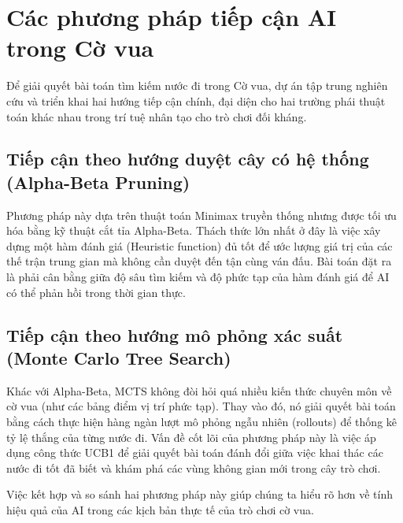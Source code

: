 \section{Các phương pháp tiếp cận AI trong Cờ vua}

Để giải quyết bài toán tìm kiếm nước đi trong Cờ vua, dự án tập trung nghiên cứu và triển khai hai hướng tiếp cận chính, đại diện cho hai trường phái thuật toán khác nhau trong trí tuệ nhân tạo cho trò chơi đối kháng.

\subsection{Tiếp cận theo hướng duyệt cây có hệ thống (Alpha-Beta Pruning)}
Phương pháp này dựa trên thuật toán Minimax truyền thống nhưng được tối ưu hóa bằng kỹ thuật cắt tỉa Alpha-Beta. Thách thức lớn nhất ở đây là việc xây dựng một hàm đánh giá (Heuristic function) đủ tốt để ước lượng giá trị của các thế trận trung gian mà không cần duyệt đến tận cùng ván đấu. Bài toán đặt ra là phải cân bằng giữa độ sâu tìm kiếm và độ phức tạp của hàm đánh giá để AI có thể phản hồi trong thời gian thực.

\subsection{Tiếp cận theo hướng mô phỏng xác suất (Monte Carlo Tree Search)}
Khác với Alpha-Beta, MCTS không đòi hỏi quá nhiều kiến thức chuyên môn về cờ vua (như các bảng điểm vị trí phức tạp). Thay vào đó, nó giải quyết bài toán bằng cách thực hiện hàng ngàn lượt mô phỏng ngẫu nhiên (rollouts) để thống kê tỷ lệ thắng của từng nước đi. Vấn đề cốt lõi của phương pháp này là việc áp dụng công thức UCB1 để giải quyết bài toán đánh đổi giữa việc khai thác các nước đi tốt đã biết và khám phá các vùng không gian mới trong cây trò chơi.

Việc kết hợp và so sánh hai phương pháp này giúp chúng ta hiểu rõ hơn về tính hiệu quả của AI trong các kịch bản thực tế của trò chơi cờ vua.
